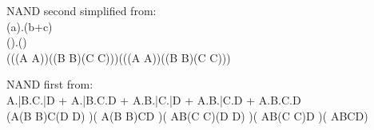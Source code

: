 NAND
 second simplified from: $$$$(a).(b+c)$$
$$().()$$
$$$$
$$(((A \uparrow  A))\uparrow ((B \uparrow  B)\uparrow (C \uparrow  C)))\uparrow (((A \uparrow  A))\uparrow ((B \uparrow  B)\uparrow (C \uparrow  C)))$$$$


NAND
 first from: $$$$A.\bar B.C.\bar D + A.\bar B.C.D + A.B.\bar C.\bar D + A.B.\bar C.D + A.B.C.D$$
$$$$
$$$$
$$(A\uparrow (B \uparrow  B)\uparrow C\uparrow (D \uparrow  D) )\big\uparrow ( A\uparrow (B \uparrow  B)\uparrow C\uparrow D )\big\uparrow ( A\uparrow B\uparrow (C \uparrow  C)\uparrow (D \uparrow  D) )\big\uparrow ( A\uparrow B\uparrow (C \uparrow  C)\uparrow D )\big\uparrow ( A\uparrow B\uparrow C\uparrow D)$$$$


